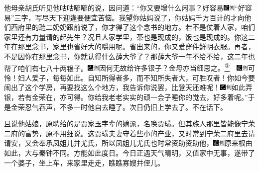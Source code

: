 他母亲胡氏听见他咕咕嘟嘟的说，因问道：``你又要增什么闲事？好容易{\includegraphics[width=3mm]{../Images/00006}\includegraphics[width=3mm]{../Images/00011}\footnotesize \kaishu ``好容易''三字，写尽天下迎逢要便宜苦恼。}我望你姑妈说了，你姑妈千方百计的才向他们西府里的琏二奶奶跟前说了，你才得了这个念书的地方。若不是仗着人家，咱们家里还有力量请的起先生？况且人家学里，茶也是现成的，饭也是现成的。你这二年在那里念书，家里也省好大的嚼用呢。省出来的，你又爱穿件鲜明衣服。再者，不是因你在那里念书，你就认得什么薛大爷了？那薛大爷一年不给不给，这二年也帮了咱们有七八十两银子。{\includegraphics[width=3mm]{../Images/00003}\includegraphics[width=3mm]{../Images/00011}\footnotesize \kaishu 因何无故给许多银子？金母亦当细思之。}\href{../Text/part0014_split_000.html\#lnkback_1_a}{\textsuperscript{①}}{　\includegraphics[width=3mm]{../Images/00006}\includegraphics[width=3mm]{../Images/00011}\footnotesize \kaishu 可怜！妇人爱子，每每如此。自知所得者多，而不知所失者大，可胜叹者！}你如今要闹出了这个学房，再要找这么个地方，我告诉你说罢，比登天还难呢！{\includegraphics[width=3mm]{../Images/00003}\includegraphics[width=3mm]{../Images/00011}\footnotesize \kaishu 如此弄银，若有金荣在，亦可得。}你给我老老实实的顽一会子睡你的觉去，好多着呢。''于是金荣忍气吞声，不多一时他自去睡了。次日仍旧上学去了。不在话下。

且说他姑娘，原聘给的是贾家玉字辈的嫡派，名唤贾璜。但其族人那里皆能像宁荣二府的富势，原不用细说。这贾璜夫妻守着些小的产业，又时常到宁荣二府里去请请安，又会奉承凤姐儿并尤氏，所以凤姐儿尤氏也时常资助资助他，{\includegraphics[width=3mm]{../Images/00006}\includegraphics[width=3mm]{../Images/00011}\footnotesize \kaishu 原来根由如此，大与秦钟不同。}方能如此度日。今日正遇天气晴明，又值家中无事，遂带了一个婆子，坐上车，来家里走走，瞧瞧寡嫂并侄儿。

